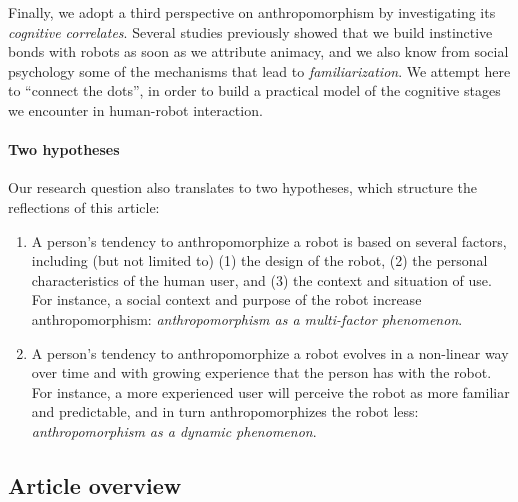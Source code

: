 \documentclass{frontiersSCNS} %
\begin{document}
Finally, we adopt a third perspective on anthropomorphism by investigating its
\emph{cognitive correlates}. Several studies previously showed that we build
instinctive bonds with robots as soon as we attribute animacy, and we also know
from social psychology some of the mechanisms that lead to
\emph{familiarization}. We attempt here to ``connect the dots'', in order to
build a practical model of the cognitive stages we encounter in human-robot
interaction.


\paragraph{Two hypotheses} Our research question also translates to two
hypotheses, which structure the reflections of this article:

\begin{enumerate} 
    
\item A person's tendency to anthropomorphize a robot
    is based on several factors, including (but not limited to) (1) the
    design of the robot, (2) the personal characteristics of the human user,
    and (3) the context and situation of use. For instance, a social context
    and purpose of the robot increase anthropomorphism: \textit{anthropomorphism
    as a multi-factor phenomenon}.

\item A person's tendency to anthropomorphize a robot
    evolves in a non-linear way over time and with growing experience that the
    person has with the robot. For instance, a more experienced user will
    perceive the robot as more familiar and predictable, and in turn
    anthropomorphizes the robot less: \textit{anthropomorphism as a dynamic
    phenomenon}.

\end{enumerate}

\subsection{Article overview}
\end{document}
